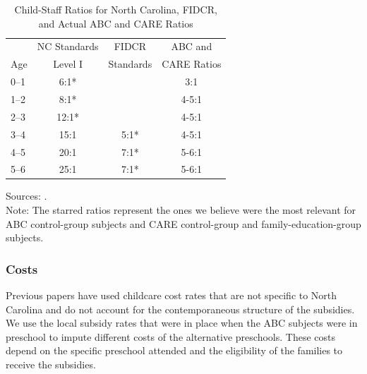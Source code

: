 \begin{appendices}
\begin{table}[H]
\caption{Child-Staff Ratios for North Carolina, FIDCR, and Actual ABC and CARE Ratios}
\label{table:staff}
\begin{threeparttable}
\begin{tabular}{lccc}
\toprule
 &NC Standards & FIDCR &  ABC and   \\
Age	& Level I &  Standards  & CARE Ratios\\ \midrule
0--1	& 6:1*	&  				& 	3:1					\\
1--2	& 8:1* 	& 				&   4-5:1				\\
2--3	& 12:1* & 				& 	4-5:1				\\
3--4	& 15:1 	& 		5:1*	& 	4-5:1 				\\
4--5	& 20:1 	& 		7:1*	& 	5-6:1 				\\
5--6 & 25:1  &		7:1*	&	5-6:1				\\
\bottomrule
\end{tabular}
\begin{tablenotes}
\footnotesize
Sources: \cite{Department-of-Health_1968_DayCareRequirements,NCGA_1971_House-Bill-100,Ramey-et-al_1977_Intro-to-ABC,Ramey_Campbell_1979_SR,Ramey_McGinness_etal_1982_Abecedarianapproach, Burchinal_Campbell_etal_1997_CD}.\\
Note: The starred ratios represent the ones we believe were the most relevant for ABC control-group subjects and CARE control-group and family-education-group subjects.
\end{tablenotes}
\end{threeparttable}
\end{table}

\subsubsection{Costs}
\noindent Previous papers have used childcare cost rates that are not specific to North Carolina and do not account for the contemporaneous structure of the subsidies. We use the local subsidy rates that were in place when the ABC subjects were in preschool to impute different costs of the alternative preschools. These costs depend on the specific preschool attended and the eligibility of the families to receive the subsidies. \\


\end{appendices}
